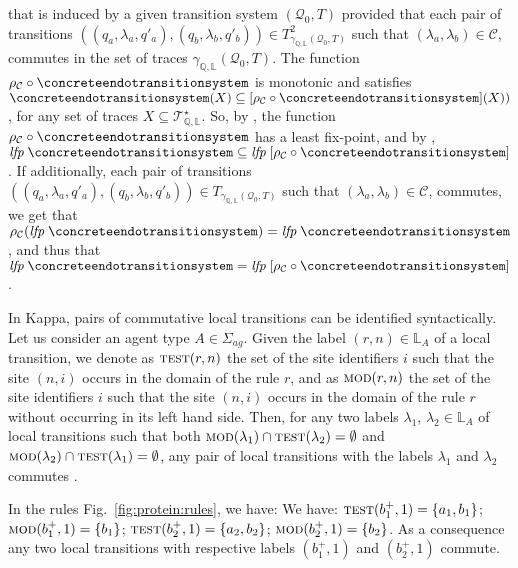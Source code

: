 \documentclass[10pt,a4paper]{llncs}
\newcommand{\agentname}{\signaturesymb_{\textit{ag}}}
\newcommand{\signaturesymb}{\Sigma}
\newcommand{\states}{\mathbb{Q}}
\newcommand{\labels}{\mathbb{L}}
\newcommand{\locallabels}[1][A]{\labels_{#1}}
\newcommand{\transitionsystemwoparentheses}{\mathcal{Q}_0,T}
\newcommand{\transitions}[1][X]{T_{#1}}
\newcommand{\transitionsystem}{(\transitionsystemwoparentheses)}
\newcommand{\traces}[1][\states,\labels]{\mathcal{T}^{\star}_{#1}}
\newcommand{\gammatransitionsystem}[1][\states,\labels]{\gamma_{#1}}
\newcommand{\lfp}[1]{\textit{lfp}\;#1}
\newcommand{\test}[1][r,n]{\textsc{test}(#1)}
\newcommand{\modif}[1][r,n]{\textsc{mod}(#1)}
\begin{document}
 that is induced by a given transition system $\transitionsystem$ provided that each pair of transitions $((q_a,\lambda_a,q'_a),(q_b,\lambda_b,q'_b))\in \transitions[\gammatransitionsystem\transitionsystem]^2$ such that
 $(\lambda_a,\lambda_b)\in\mathcal{C}$, commutes in the set of traces $\gammatransitionsystem\transitionsystem$. The function $\rho_{\mathcal{C}}\circ \concreteendotransitionsystem$ is monotonic and satisfies $\concreteendotransitionsystem(X)\subseteq [\rho_{\mathcal{C}}\circ\concreteendotransitionsystem](X))$, for any set of traces $X\subseteq \traces$. So, by \cite{Tarski}, the function
 $\rho_{\mathcal{C}}\circ\concreteendotransitionsystem$ has a least fix-point, and by \cite{Cousot1979}, $\lfp \concreteendotransitionsystem \subseteq
 \lfp [\rho_{\mathcal{C}} \circ \concreteendotransitionsystem]$.
If additionally, each pair of transitions $((q_a,\lambda_a,q'_a),(q_b,\lambda_b,q'_b))\in \transitions[\gammatransitionsystem\transitionsystem]$ such that
$(\lambda_a,\lambda_b)\in\mathcal{C}$, commutes, we get that  $\rho_{\mathcal{C}}(\lfp \concreteendotransitionsystem)=\lfp \concreteendotransitionsystem$, and thus that $\lfp \concreteendotransitionsystem = \lfp [\rho_{\mathcal{C}} \circ \concreteendotransitionsystem]$.

 In Kappa, pairs of commutative local transitions can be identified  syntactically. Let us consider an agent type $A\in\agentname$.
  Given the label $(r,n)\in\locallabels$ of a local transition, we denote as $\test$ the set of the site identifiers $i$ such that the site $(n,i)$ occurs in the domain of the rule $r$, and as $\modif$ the set of the site identifiers $i$ such that the site $(n,i)$ occurs in the domain of the rule $r$ without occurring in its left hand side.
 Then, for any two labels $\lambda_1$, $\lambda_2\in\locallabels$ of local transitions such that both $\modif[\lambda_1]\cap\test[\lambda_2]=\emptyset$
 and $\modif[\lambda_2]\cap\test[\lambda_1]=\emptyset$,  any pair of local transitions with the labels $\lambda_1$ and $\lambda_2$ commutes \cite{jlaurent}.




\begin{example}
In the rules Fig.~\ref{fig:protein:rules}, we have:
We have: %
$\test[b_1^+,1]=\{a_1,b_1\} $; $\modif[b_1^+,1]=\{b_1\}$;
$\test[b_2^+,1]=\{a_2,b_2\} $; $\modif[b_2^+,1]=\{b_2\}$.
As a consequence any two  local transitions with respective labels
$(b_1^+,1)$ and $(b_2^+,1)$ commute.
\end{example}
\end{document}
